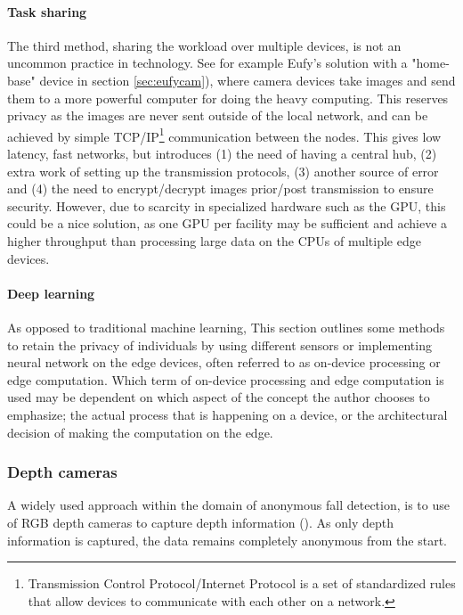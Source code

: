 \paragraph{Task sharing}
The third method, sharing the workload over multiple devices, is not an uncommon practice in technology. See for example Eufy's solution with a "home-base" device in section \ref{sec:eufycam}), where camera devices take images and send them to a more powerful computer for doing the heavy computing. This reserves privacy as the images are never sent outside of the local network, and can be achieved by simple TCP/IP\footnote{Transmission Control Protocol/Internet Protocol is a set of standardized rules that allow devices to communicate with each other on a network.} communication between the nodes. This gives low latency, fast networks, but introduces (1) the need of having a central hub, (2) extra work of setting up the transmission protocols, (3) another source of error and (4) the need to encrypt/decrypt images prior/post transmission to ensure security. However, due to scarcity in specialized hardware such as the GPU, this could be a nice solution, as one GPU per facility may be sufficient and achieve a higher throughput than processing large data on the CPUs of multiple edge devices.

\paragraph{Deep learning}
As opposed to traditional machine learning,
This section outlines some methods to retain the privacy of individuals by using different sensors or implementing neural network on the edge devices, often referred to as on-device processing or edge computation. Which term of on-device processing and edge computation is used may be dependent on which aspect of the concept the author chooses to emphasize; the actual process that is happening on a device, or the architectural decision of making the computation on the edge.

\subsubsection{Depth cameras}
A widely used approach within the domain of anonymous fall detection, is to use of RGB depth cameras to capture depth information (\cite{wa2020elderly_fall_detection_meta}). As only depth information is captured, the data remains completely anonymous from the start.

